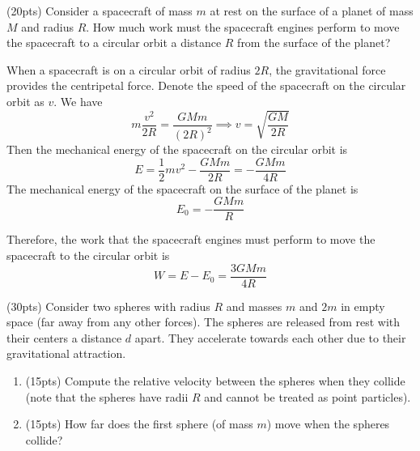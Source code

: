 \documentclass{article}
\begin{document}
\begin{problem}
(20pts) Consider a spacecraft of mass $m$ at rest on the surface of a planet of mass $M$
and radius $R$. How much work must the spacecraft engines perform to move the
spacecraft to a circular orbit a distance $R$ from the surface of the planet?
\end{problem}

\begin{solution}
  When a spacecraft is on a circular orbit of radius $2R$, the gravitational force provides the centripetal force. Denote the speed of the spacecraft on the circular orbit as $v$. We have
  \[ m\frac{v^2}{2R}= \frac{GMm}{(2R)^2}\implies v= \sqrt{\frac{GM}{2R}} \]
  Then the mechanical energy of the spacecraft on the circular orbit is
  \[ E= \frac{1}{2}mv^2 - \frac{GMm}{2R}= -\frac{GMm}{4R} \]
  The mechanical energy of the spacecraft on the surface of the planet is
  \[ E_0= -\frac{GMm}{R} \]\par
  Therefore, the work that the spacecraft engines must perform to move the spacecraft to the circular orbit is
  \[ W= E- E_0= \frac{3GMm}{4R} \]
\end{solution}



\begin{problem}
(30pts) Consider two spheres with radius $R$ and masses $m$ and $2m$ in empty space
(far away from any other forces). The spheres are released from rest with their centers
a distance $d$ apart. They accelerate towards each other due to their gravitational
attraction.

\begin{enumerate}[label=(\alph*)]
	\item (15pts) Compute the relative velocity between the spheres when they collide (note
	that the spheres have radii $R$ and cannot be treated as point particles).
	\item (15pts) How far does the first sphere (of mass $m$) move when the spheres collide?
\end{enumerate}
\end{problem}
\end{document}
